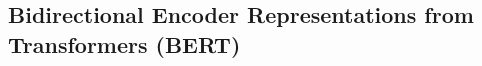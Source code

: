 \documentclass[researchlab,palatino]{AIGpaper}
\begin{document}
\subsection{Bidirectional Encoder Representations from Transformers (BERT)}
\label{Transformer}




\label{Experimente}





\newpage
\addreferences

\end{document}
